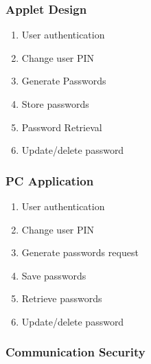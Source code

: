 \documentclass{beamer}
\begin{document}
  \begin{frame}
    \frametitle{Applet Design}
  	\begin{enumerate}
	\item User authentication
	\item Change user PIN
	\item Generate Passwords
	\item Store passwords
	\item Password Retrieval
	\item Update/delete password		
	\end{enumerate}
  \end{frame}
  
  \begin{frame}
    \frametitle{PC Application}
    
    \begin{enumerate}
    	\item User authentication
	\item Change user PIN
	\item Generate passwords request
	\item Save passwords
	\item Retrieve passwords 
	\item Update/delete password	
    \end{enumerate}  
  \end{frame}
  
  \begin{frame}
    \frametitle{Communication Security}
  
  \end{frame}
  
\end{document}
